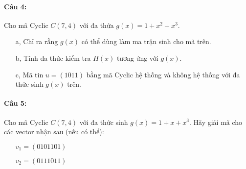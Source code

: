 \documentclass[paper=a4, fontsize=11pt]{scrartcl}
\numberwithin{equation}{section}		%
\numberwithin{figure}{section}			%
\numberwithin{table}{section}				%
\begin{document}
	\paragraph{Câu 4:} Cho mã Cyclic $C(7,4)$ với đa thứa $g(x)= 1+ x^2 + x^3$.
	
	\begin{itemize}
		\item[a,] Chỉ ra rằng $g(x)$ có thể dùng làm ma trận sinh cho mã trên.
		\item[b,] Tính đa thức kiểm tra $H(x)$ tương ứng với $g(x)$. 
		\item[c,] Mã tin $u= (1011)$ bằng mã Cyclic hệ thống và không hệ thống với đa thức sinh $g(x)$ trên.
	\end{itemize}
	
	\paragraph{Câu 5:} Cho mã Cyclic $C(7,4)$ với đa thức sinh $g(x)= 1+ x + x^3$. Hãy giải mã cho các vector nhận sau (nếu có thể):
	
	\begin{itemize}
		\item[] $v_1= (0101101)$
		\item[] $v_2= (0111011)$
	\end{itemize}
	
\end{document}
